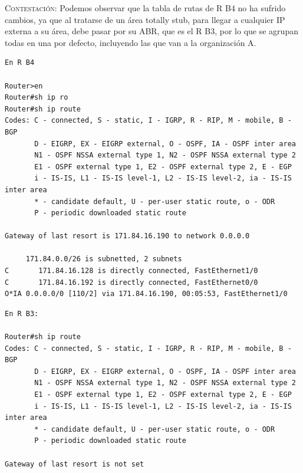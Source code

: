\documentclass[11pt]{article}
\begin{document}
\begin{enumerate}
    \textsc{Contestación}: Podemos observar que la tabla de rutas de R B4 no ha sufrido cambios, ya que al tratarse de un área totally stub, para llegar a cualquier IP externa a su área, debe pasar por su ABR, que es el R B3, por lo que se agrupan todas en una por defecto, incluyendo las que van a la organización A.

\begin{mdframed}
\begin{verbatim}
En R B4

Router>en
Router#sh ip ro
Router#sh ip route 
Codes: C - connected, S - static, I - IGRP, R - RIP, M - mobile, B - BGP
       D - EIGRP, EX - EIGRP external, O - OSPF, IA - OSPF inter area
       N1 - OSPF NSSA external type 1, N2 - OSPF NSSA external type 2
       E1 - OSPF external type 1, E2 - OSPF external type 2, E - EGP
       i - IS-IS, L1 - IS-IS level-1, L2 - IS-IS level-2, ia - IS-IS inter area
       * - candidate default, U - per-user static route, o - ODR
       P - periodic downloaded static route

Gateway of last resort is 171.84.16.190 to network 0.0.0.0

     171.84.0.0/26 is subnetted, 2 subnets
C       171.84.16.128 is directly connected, FastEthernet1/0
C       171.84.16.192 is directly connected, FastEthernet0/0
O*IA 0.0.0.0/0 [110/2] via 171.84.16.190, 00:05:53, FastEthernet1/0
\end{verbatim}
\end{mdframed}
    
\begin{mdframed}
\begin{verbatim}
En R B3:

Router#sh ip route
Codes: C - connected, S - static, I - IGRP, R - RIP, M - mobile, B - BGP
       D - EIGRP, EX - EIGRP external, O - OSPF, IA - OSPF inter area
       N1 - OSPF NSSA external type 1, N2 - OSPF NSSA external type 2
       E1 - OSPF external type 1, E2 - OSPF external type 2, E - EGP
       i - IS-IS, L1 - IS-IS level-1, L2 - IS-IS level-2, ia - IS-IS inter area
       * - candidate default, U - per-user static route, o - ODR
       P - periodic downloaded static route

Gateway of last resort is not set


\end{verbatim}
\end{mdframed}
\end{enumerate}
\end{document}
